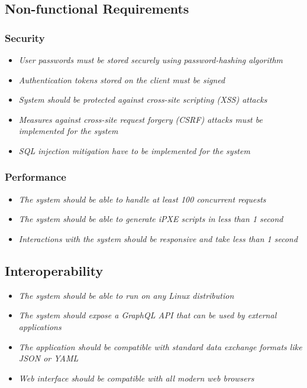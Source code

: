 \documentclass[../main.tex]{subfiles}
\begin{document}
\subsection{Non-functional Requirements}

\subsubsection{Security}
\label{req-nf:security}

\begin{itemize}
  \item \emph{User passwords must be stored securely using password-hashing algorithm}
  \item \emph{Authentication tokens stored on the client must be signed}
  \item \emph{System should be protected against cross-site scripting (XSS) attacks}
  \item \emph{Measures against cross-site request forgery (CSRF) attacks must be implemented for the system}
  \item \emph{SQL injection mitigation have to be implemented for the system}
\end{itemize}

\subsubsection{Performance}
\label{req-nf:performance}

\begin{itemize}
  \item \emph{The system should be able to handle at least 100 concurrent requests}
  \item \emph{The system should be able to generate iPXE scripts in less than 1 second}
  \item \emph{Interactions with the system should be responsive and take less than 1 second}
\end{itemize}

\subsection{Interoperability}
\label{req-nf:interoperability}

\begin{itemize}
  \item \emph{The system should be able to run on any Linux distribution}
  \item \emph{The system should expose a GraphQL API that can be used by external applications}
  \item \emph{The application should be compatible with standard data exchange formats like JSON or YAML}
  \item \emph{Web interface should be compatible with all modern web browsers}
\end{itemize}
\end{document}
